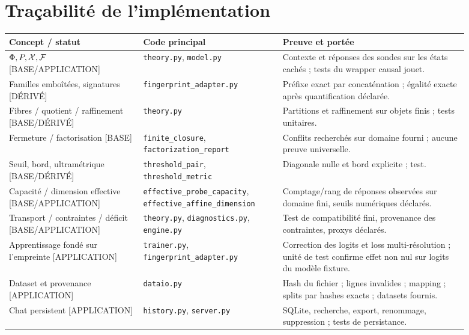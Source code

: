 \documentclass[11pt,a4paper]{article}
\begin{document}
\section{Traçabilité de l'implémentation}
\begin{longtable}{p{0.26\linewidth}p{0.27\linewidth}p{0.36\linewidth}}
\toprule
\textbf{Concept / statut} & \textbf{Code principal} & \textbf{Preuve et portée}\\\midrule
\endhead
\(\Phi,P,\mathcal X,\mathcal F\) [BASE/APPLICATION] & \texttt{theory.py}, \texttt{model.py} & Contexte et réponses des sondes sur les états cachés ; tests du wrapper causal jouet.\\
Familles emboîtées, signatures [DÉRIVÉ] & \texttt{fingerprint\_adapter.py} & Préfixe exact par concaténation ; égalité exacte après quantification déclarée.\\
Fibres / quotient / raffinement [BASE/DÉRIVÉ] & \texttt{theory.py} & Partitions et raffinement sur objets finis ; tests unitaires.\\
Fermeture / factorisation [BASE] & \texttt{finite\_closure}, \texttt{factorization\_report} & Conflits recherchés sur domaine fourni ; aucune preuve universelle.\\
Seuil, bord, ultramétrique [BASE/DÉRIVÉ] & \texttt{threshold\_pair}, \texttt{threshold\_metric} & Diagonale nulle et bord explicite ; test.\\
Capacité / dimension effective [BASE/APPLICATION] & \texttt{effective\_probe\_capacity}, \texttt{effective\_affine\_dimension} & Comptage/rang de réponses observées sur domaine fini, seuils numériques déclarés.\\
Transport / contraintes / déficit [BASE/APPLICATION] & \texttt{theory.py}, \texttt{diagnostics.py}, \texttt{engine.py} & Test de compatibilité fini, provenance des contraintes, proxys déclarés.\\
Apprentissage fondé sur l'empreinte [APPLICATION] & \texttt{trainer.py}, \texttt{fingerprint\_adapter.py} & Correction des logits et loss multi-résolution ; unité de test confirme effet non nul sur logits du modèle fixture.\\
Dataset et provenance [APPLICATION] & \texttt{dataio.py} & Hash du fichier ; lignes invalides ; mapping ; splits par hashes exacts ; datasets fournis.\\
Chat persistent [APPLICATION] & \texttt{history.py}, \texttt{server.py} & SQLite, recherche, export, renommage, suppression ; tests de persistance.\\
\bottomrule
\end{longtable}
\end{document}
